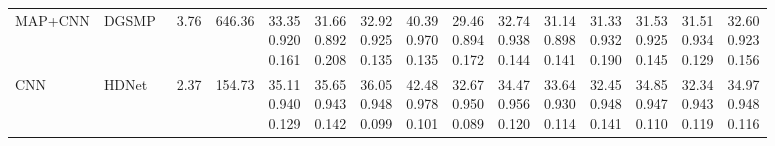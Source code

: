 \documentclass[letterpaper]{article} %
\begin{document}
\begin{table}[!t]
{\begin{tabular}{ll|cc|*{10}{c}|c}
\rowcolor{costgray}
MAP+CNN & DGSMP~\cite{huang2021dgsmp} & 3.76 & 646.36 & \makecell{33.35\\0.920\\0.161} & \makecell{31.66\\0.892\\0.208} & \makecell{32.92\\0.925\\0.135} & \makecell{40.39\\0.970\\0.135} & \makecell{29.46\\0.894\\0.172} & \makecell{32.74\\0.938\\0.144} & \makecell{31.14\\0.898\\0.141} & \makecell{31.33\\0.932\\0.190} & \makecell{31.53\\0.925\\0.145} & \makecell{31.51\\0.934\\0.129} & \makecell{32.60\\0.923\\0.156} \\
\rowcolor{costgray}
CNN & HDNet~\cite{hu2022hdnet} & 2.37 & 154.73 & \makecell{35.11\\0.940\\0.129} & \makecell{35.65\\0.943\\0.142} & \makecell{36.05\\0.948\\0.099} & \makecell{42.48\\0.978\\0.101} & \makecell{32.67\\0.950\\0.089} & \makecell{34.47\\0.956\\0.120} & \makecell{33.64\\0.930\\0.114} & \makecell{32.45\\0.948\\0.141} & \makecell{34.85\\0.947\\0.110} & \makecell{32.34\\0.943\\0.119} & \makecell{34.97\\0.948\\0.116} \\

\end{tabular}}
\end{table}
\end{document}
